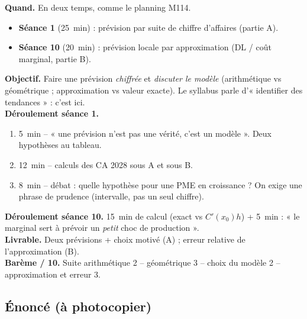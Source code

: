 \documentclass[12pt,a4paper]{article}
\begin{document}
\begin{profbox}
\textbf{Quand.} En deux temps, comme le planning M114.
\begin{itemize}[leftmargin=1.2cm]
  \item \textbf{Séance 1} (25~min) : prévision par suite de chiffre d'affaires (partie A).
  \item \textbf{Séance 10} (20~min) : prévision locale par approximation (DL / coût marginal, partie B).
\end{itemize}
\textbf{Objectif.} Faire une prévision \emph{chiffrée} et \emph{discuter le modèle} (arithmétique vs géométrique ; approximation vs valeur exacte). Le syllabus parle d'« identifier des tendances » : c'est ici.\\
\textbf{Déroulement séance 1.}
\begin{enumerate}[leftmargin=1.3cm]
  \item 5~min -- « une prévision n'est pas une vérité, c'est un modèle ». Deux hypothèses au tableau.
  \item 12~min -- calculs des CA 2028 sous A et sous B.
  \item 8~min -- débat : quelle hypothèse pour une PME en croissance ? On exige une phrase de prudence (intervalle, pas un seul chiffre).
\end{enumerate}
\textbf{Déroulement séance 10.} 15~min de calcul (exact vs $C'(x_0)h$) + 5~min : « le marginal sert à prévoir un \emph{petit} choc de production ».\\
\textbf{Livrable.} Deux prévisions + choix motivé (A) ; erreur relative de l'approximation (B).\\
\textbf{Barème / 10.} Suite arithmétique 2 -- géométrique 3 -- choix du modèle 2 -- approximation et erreur 3.
\end{profbox}

\subsection{Énoncé (à photocopier)}
\end{document}

